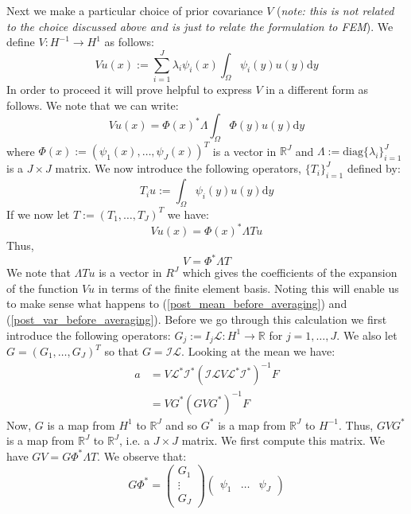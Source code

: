 Next we make a particular choice of prior covariance $V$ (\textit{note: this is not related to the choice discussed above and is just to relate the formulation to FEM}). We define $V:H^{-1}\rightarrow H^1$ as follows:
\begin{equation}
    \label{FEM_prior}
    Vu(x) := \sum_{i=1}^{J}\lambda_{i}\psi_{i}(x)\int_{\Omega}\psi_{i}(y)u(y)\mathrm{d}y
\end{equation}
In order to proceed it will prove helpful to express $V$ in a different form as follows. We note that we can write:
\begin{equation*}
    Vu(x)=\Phi(x)^{*}\Lambda\int_{\Omega}\Phi(y)u(y)\mathrm{d}y
\end{equation*}
where $\Phi(x):=(\psi_{1}(x),\dots,\psi_{J}(x))^{T}$ is a vector in $\mathbb{R}^{J}$ and $\Lambda:=\text{diag}\{\lambda_{i}\}_{i=1}^{J}$ is a $J\times J$ matrix. We now introduce the following operators, $\{T_i\}_{i=1}^{J}$ defined by:
\begin{equation*}
    T_{i}u:=\int_{\Omega}\psi_{i}(y)u(y)\mathrm{d}y
\end{equation*}
If we now let $T:=(T_1,\dots,T_{J})^{T}$ we have:
\begin{equation*}
    Vu(x)=\Phi(x)^{*}\Lambda Tu
\end{equation*}
Thus,
\begin{equation*}
    V=\Phi^{*}\Lambda T
\end{equation*}
We note that $\Lambda Tu$ is a vector in $R^{J}$ which gives the coefficients of the expansion of the function $Vu$ in terms of the finite element basis. Noting this will enable us to make sense what happens to (\ref{post_mean_before_averaging}) and (\ref{post_var_before_averaging}). Before we go through this calculation we first introduce the following operators: $G_j:=I_{j}\mathcal{L}:H^{1}\rightarrow\mathbb{R}$ for $j=1,\dots,J$. We also let $G=(G_1,\dots,G_J)^{T}$ so that $G=\mathcal{I}\mathcal{L}$. Looking at the mean we have:
\begin{align*}
    a &= V\mathcal{L}^{*}\mathcal{I}^{*}(\mathcal{I}\mathcal{L}V\mathcal{L}^{*}\mathcal{I}^{*})^{-1}F \\
    &= VG^{*}(GVG^{*})^{-1}F
\end{align*}
Now, $G$ is a map from $H^{1}$ to $\mathbb{R}^{J}$ and so $G^{*}$ is a map from $\mathbb{R}^{J}$ to $H^{-1}$. Thus, $GVG^{*}$ is a map from $\mathbb{R}^{J}$ to $\mathbb{R}^{J}$, i.e. a $J\times J$ matrix. We first compute this matrix. We have $GV=G\Phi^{*}\Lambda T$. We observe that:
\begin{equation*}
    G\Phi^{*}=\begin{pmatrix}
                G_1 \\
                \vdots \\
                G_{J}
              \end{pmatrix} \begin{pmatrix}
                                \psi_1 & \hdots & \psi_{J}
                            \end{pmatrix}
\end{equation*}
